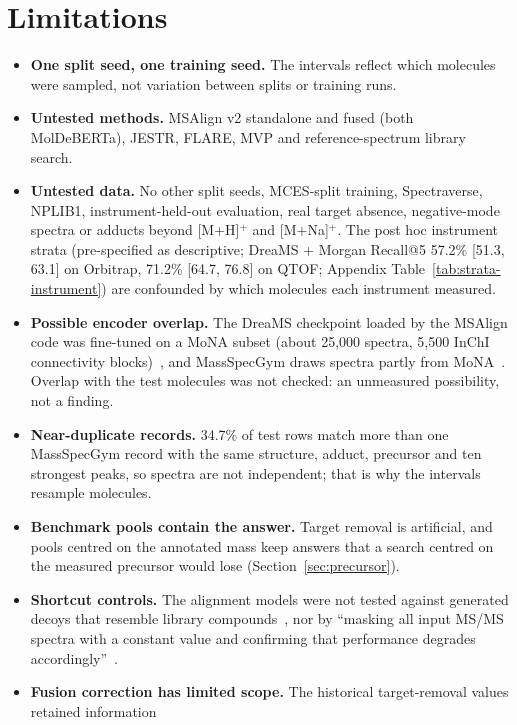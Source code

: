 \documentclass[11pt]{article}
\begin{document}
\section{Limitations}\label{sec:limitations}
\begin{itemize}
\item \textbf{One split seed, one training seed.} The intervals reflect which molecules were sampled, not variation between
splits or training runs.
\item \textbf{Untested methods.} MSAlign v2 standalone and fused (both MolDeBERTa), JESTR, FLARE, MVP and reference-spectrum
library search.
\item \textbf{Untested data.} No other split seeds, MCES-split training, Spectraverse, NPLIB1, instrument-held-out evaluation,
real target absence, negative-mode spectra or adducts beyond [M+H]$^+$ and [M+Na]$^+$. The post hoc instrument strata
(pre-specified as descriptive; DreaMS + Morgan Recall@5 57.2\% [51.3, 63.1] on Orbitrap, 71.2\% [64.7, 76.8] on QTOF; Appendix
Table~\ref{tab:strata-instrument}) are confounded by which molecules each instrument measured.
\item \textbf{Possible encoder overlap.} The DreaMS checkpoint loaded by the MSAlign code was fine-tuned on a MoNA subset (about
25,000 spectra, 5,500 InChI connectivity blocks)~\citep{bushuiev2026dreams}, and MassSpecGym draws spectra partly from
MoNA~\citep{bushuiev2024massspecgym}. Overlap with the test molecules was not checked: an unmeasured possibility, not a
finding.
\item \textbf{Near-duplicate records.} 34.7\% of test rows match more than one MassSpecGym record with the same structure,
adduct, precursor and ten strongest peaks, so spectra are not independent; that is why the intervals resample molecules.
\item \textbf{Benchmark pools contain the answer.} Target removal is artificial, and pools centred on the annotated mass keep
answers that a search centred on the measured precursor would lose (Section~\ref{sec:precursor}).
\item \textbf{Shortcut controls.} The alignment models were not tested against generated decoys that resemble library
compounds~\citep{gupta2026spurious}, nor by ``masking all input MS/MS spectra with a constant value and confirming that
performance degrades accordingly''~\citep{liu2026wild}.
\item \textbf{Fusion correction has limited scope.} The historical target-removal values retained information

\end{itemize}
\end{document}

